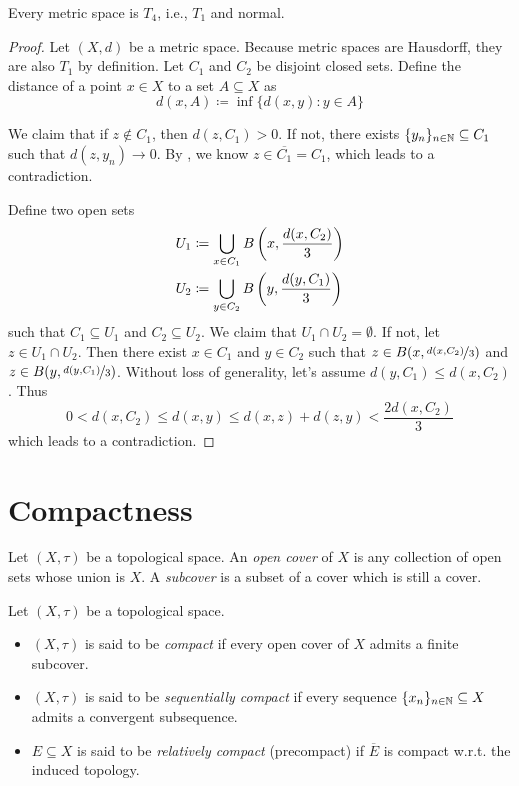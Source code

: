 \documentclass[screen]{techreport}
\numberwithin{equation}{section}
\begin{document}
\begin{proposition}\label{Prop:MetricT4}
	Every metric space is $T_4$, i.e., $T_1$ and normal.
\end{proposition}
\begin{proof}
	Let $(X,d)$ be a metric space.
	Because metric spaces are Hausdorff, they are also $T_1$ by definition.
	Let $C_1$ and $C_2$ be disjoint closed sets.
	Define the distance of a point $x \in X$ to a set $A \subseteq X$ as
	\[
	d(x,A) \coloneqq \inf \{ d(x,y) : y \in A \}
	\]
	
	We claim that if $z \not\in C_1$, then $d(z,C_1) > 0$.
	If not, there exists $\{y_n\}_{n \in \mathbb{N}} \subseteq C_1$ such that $d(z,y_n) \rightarrow 0$.
	By , we know $z \in \overline{C_1} = C_1$, which leads to a contradiction.
	
	Define two open sets
	\begin{align}
		U_1 & \coloneqq \bigcup_{x \in C_1} B\left({x,\frac{d(x,C_2)}{3}}\right) \\
		U_2 & \coloneqq \bigcup_{y \in C_2} B\left({y,\frac{d(y,C_1)}{3}}\right)
	\end{align}
	such that $C_1 \subseteq U_1$ and $C_2 \subseteq U_2$.
	We claim that $U_1 \cap U_2 = \emptyset$.
	If not, let $z \in U_1 \cap U_2$.
	Then there exist $x \in C_1$ and $y \in C_2$ such that $z \in B(x,\nicefrac{d(x,C_2)}{3})$ and $z \in B(y,\nicefrac{d(y,C_1)}{3})$.
	Without loss of generality, let's assume $d(y,C_1) \le d(x,C_2)$.
	Thus
	\[
	0 < d(x,C_2) \le d(x,y) \le d(x,z)+d(z,y) < \frac{2d(x,C_2)}{3}
	\]
	which leads to a contradiction.
\end{proof}

\section{Compactness}

\begin{definition}\label{De:Covers}
	Let $(X,\tau)$ be a topological space.
	An \emph{open cover} of $X$ is any collection of open sets whose union is $X$.
	A \emph{subcover} is a subset of a cover which is still a cover.
\end{definition}

\begin{definition}\label{De:CompactSpace}
	Let $(X,\tau)$ be a topological space.
	\begin{itemize}
		\item $(X,\tau)$ is said to be \emph{compact} if every open cover of $X$ admits a finite subcover.
		\item $(X,\tau)$ is said to be \emph{sequentially compact} if every sequence $\{x_n\}_{n \in \mathbb{N}} \subseteq X$ admits a convergent subsequence.
		\item $E \subseteq X$ is said to be \emph{relatively compact} (precompact) if $\overline{E}$ is compact w.r.t. the induced topology.
	\end{itemize}
\end{definition}
\end{document}

